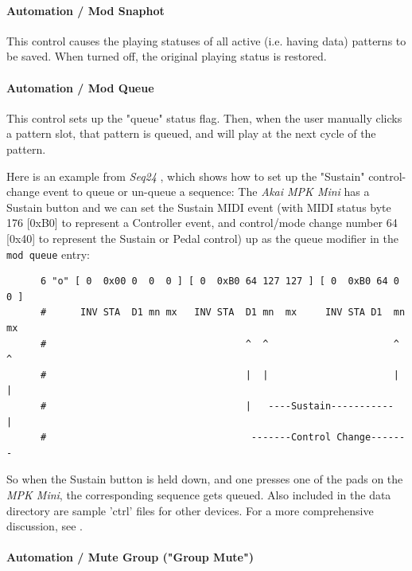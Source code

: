 \paragraph{Automation / Mod Snaphot}
\label{paragraph:configuration_midi_ctrl_modsnap}

   This control causes the playing statuses of all active
   (i.e. having data) patterns to be saved.  When turned off, the
   original playing status is restored.

\paragraph{Automation / Mod Queue}
\label{paragraph:configuration_midi_ctrl_modqueue}

   This control sets up the "queue" status flag.
   Then, when the user manually clicks a pattern slot,
   that pattern is queued, and will play at the next cycle of the
   pattern.

   Here is an example from  \textsl{Seq24} \cite{midicontrol},
   which shows how to set up
   the "Sustain" control-change event to queue or un-queue a sequence:
   The \textsl{Akai MPK Mini} has a Sustain button and we can set the
   Sustain MIDI event (with MIDI status byte 176 [0xB0] to represent a
   Controller event, and control/mode change number 64 [0x40] to
   represent the Sustain or Pedal control) up as the queue modifier in
   the \texttt{mod queue} entry:

   \begin{verbatim}
      6 "o" [ 0  0x00 0  0  0 ] [ 0  0xB0 64 127 127 ] [ 0  0xB0 64 0  0 ]
      #      INV STA  D1 mn mx   INV STA  D1 mn  mx     INV STA D1  mn mx
      #                                   ^  ^                      ^  ^
      #                                   |  |                      |  |
      #                                   |   ----Sustain-----------   |
      #                                    -------Control Change-------
   \end{verbatim}

   So when the Sustain button is held down, and one presses one of the pads
   on the \textsl{MPK Mini}, the corresponding sequence gets queued.
   Also included in the data directory are sample 'ctrl' files for other
   devices.
   For a more comprehensive discussion, see
   .

\paragraph{Automation / Mute Group ("Group Mute")}
\label{paragraph:configuration_midi_ctrl_modgmute}

